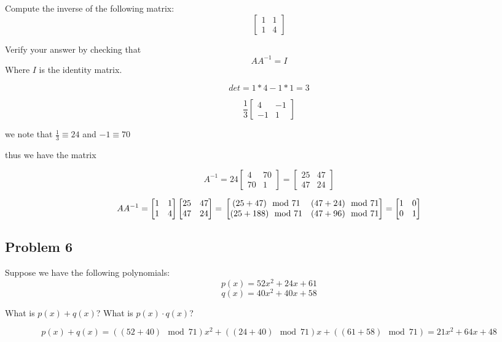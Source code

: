 \documentclass{article}
\begin{document}
Compute the inverse of the following matrix:
\[
\begin{bmatrix} 1 & 1 \\ 1 & 4\end{bmatrix}
\]

Verify your answer by checking that
\[
A A^{-1} = I
\]
Where \( I \) is the identity matrix.


\[
det = 1 * 4 - 1 * 1 = 3
\]


\[
\frac{1}{3} \begin{bmatrix} 4 & -1 \\ -1 & 1 \end{bmatrix}
\]

we note that $\frac{1}{3} \equiv 24$ and $-1 \equiv 70$

thus we have the matrix 

\[
A^{-1} = 24 \begin{bmatrix} 4 & 70 \\ 70 & 1 \end{bmatrix} = \begin{bmatrix} 25 & 47 \\ 47 & 24 \end{bmatrix}
\]

\[
A A^{-1} = \begin{bmatrix} 1 & 1 \\ 1 & 4 \end{bmatrix} \begin{bmatrix} 25 & 47 \\ 47 & 24 \end{bmatrix} =\\
\begin{bmatrix}
(25 + 47) \mod 71  & (47 + 24) \mod 71 \\
(25 + 188) \mod 71 & (47 + 96) \mod 71     
\end{bmatrix} = \begin{bmatrix}
1 & 0 \\
0 & 1
\end{bmatrix}
\] 

\subsection*{Problem 6}
Suppose we have the following polynomials:
\[
p(x) = 52x^2 + 24x + 61
\]
\[
q(x) = 40x^2 + 40x + 58
\]

What is $p(x) + q(x)$? What is $p(x) \cdot q(x)$?

\[
p(x)+ q(x) = ((52+40) \mod 71)x^2 + ((24+40) \mod 71)x + ((61+58) \mod 71) = 21x^2 + 64x + 48
\]
\end{document}

